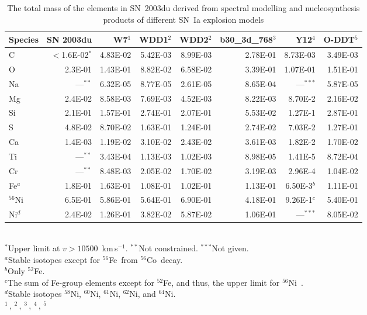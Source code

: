 \documentclass[usegraphicx,usenatbib]{mn2e}
\newcommand{\kms}{\mbox{\,km\,s$^{-1}$}}
\newcommand{\Fefs}{$^{56}$Fe}
\newcommand{\Cofs}{$^{56}$Co}
\newcommand{\Nifs}{$^{56}$Ni}
\begin{document}
\begin{table}
\caption{The total mass of the elements in SN~2003du derived from spectral modelling
and nucleosynthesis products of different SN~Ia explosion models} 
\label{tab:mass}
\begin{tabular}{lrrrrrrr}
\hline \hline
Species  & SN 2003du   & W7$^1$    & WDD1$^2$ & WDD2$^2$  & b30\_3d\_768$^3$ & Y12$^4$ & O-DDT$^5$\\
\hline		         		     		     
    C    &    $<$1.6E-02$^*$& 4.83E-02  & 5.42E-03 & 8.99E-03  & 2.78E-01  & 8.73E-03 & 3.49E-03 \\
    O    &    2.3E-01       & 1.43E-01  & 8.82E-02 & 6.58E-02  & 3.39E-01  & 1.07E-01 & 1.51E-01 \\
    Na   &    ---$^{**}$    & 6.32E-05  & 8.77E-05 & 2.61E-05  & 8.65E-04  & ---$^{***}$ & 5.87E-05 \\
    Mg   &    2.4E-02       & 8.58E-03  & 7.69E-03 & 4.52E-03  & 8.22E-03  & 8.70E-2 & 2.16E-02 \\
    Si   &    2.1E-01       & 1.57E-01  & 2.74E-01 & 2.07E-01  & 5.53E-02  & 1.27E-1 & 2.87E-01 \\
    S    &    4.8E-02       & 8.70E-02  & 1.63E-01 & 1.24E-01  & 2.74E-02  & 7.03E-2 & 1.27E-01\\
    Ca   &    1.4E-03       & 1.19E-02  & 3.10E-02 & 2.43E-02  & 3.61E-03  & 1.82E-2 & 1.70E-02 \\
    Ti   &     ---$^{**}$  & 3.43E-04  & 1.13E-03 & 1.02E-03  & 8.98E-05  & 1.41E-5 &  8.72E-04\\
    Cr   &     ---$^{**}$  & 8.48E-03  & 2.05E-02 & 1.70E-02  & 3.19E-03  & 2.96E-4 &  1.04E-02 \\
  Fe$^a$ &    1.8E-01       & 1.63E-01  & 1.08E-01 & 1.02E-01  & 1.13E-01  & 6.50E-3$^b$ & 1.11E-01\\
\Nifs    &    6.5E-01       & 5.86E-01  & 5.64E-01 & 6.90E-01  & 4.18E-01  & 9.26E-1$^c$ & 5.40E-01 \\
Ni$^d$   &    2.4E-02       & 1.26E-01  & 3.82E-02 & 5.87E-02  & 1.06E-01  & ---$^{***}$ & 8.05E-02 \\
\hline
\end{tabular}\\
$^{*}$Upper limit at $v>10500$ \kms. $^{**}$Not constrained. $^{***}$Not given.\\
$^a$Stable isotopes except for \Fefs\ from \Cofs\ decay. \\
$^b$Only $^{52}$Fe.\\
$^c$The sum of Fe-group elements except for $^{52}$Fe, and thus, 
the upper limit for \Nifs\ \citep[see][]{plewa07}.\\
$^d$Stable isotopes $^{58}$Ni, $^{60}$Ni, $^{61}$Ni, $^{62}$Ni, and $^{64}$Ni.\\
$^{1}\,$\citet{nomoto84}, $^{2}\,$\citet{iwamoto99},
$^{3}\,$\citet{travaglio04}, $^{4}\,$\citet{plewa07}, $^{5}\,$\citet{maeda10nuc}
\end{table}
\end{document}
